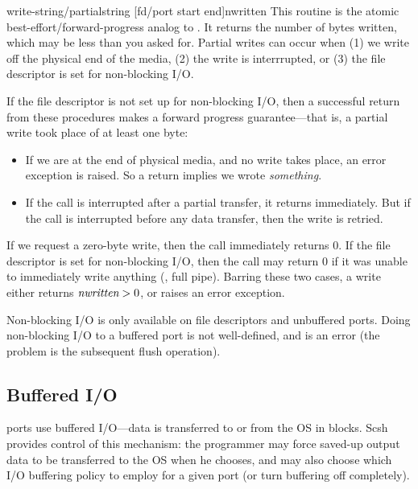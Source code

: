 \begin{defundescx}{write-string/partial}{string [fd/port start end]}{nwritten}
    This routine is the atomic best-effort/forward-progress analog
    to .
    It returns the number of bytes written, which may be less than you
    asked for.
    Partial writes can occur when (1) we write off the physical end of
    the media, (2) the write is interrrupted, or (3) the file descriptor
    is set for non-blocking I/O.

    If the file descriptor is not set up for non-blocking I/O, then
    a successful return from these procedures makes a forward progress
    guarantee---that is, a partial write took place of at least one byte:
    \begin{itemize}
    \item If we are at the end of physical media, and no write takes place,
      an error exception is raised.
      So a return implies we wrote \emph{something}.
    \item If the call is interrupted after a partial transfer, it returns
      immediately. But if the call is interrupted before any data transfer,
      then the write is retried.
    \end{itemize}

    If we request a zero-byte write, then the call immediately returns 0.
    If the file descriptor is set for non-blocking I/O, then the call
    may return 0 if it was unable to immediately write anything
    (\eg, full pipe).
    Barring these two cases, a write either returns $\var{nwritten} > 0$, 
    or raises an error exception.

    Non-blocking I/O is only available on file descriptors and unbuffered
    ports. Doing non-blocking I/O to a buffered port is not well-defined,
    and is an error (the problem is the subsequent flush operation).
    
\end{defundescx}

\subsection{Buffered I/O}

{\scm} ports use buffered I/O---data is transferred to or from the
OS in blocks. Scsh provides control of this mechanism: the programmer
may force saved-up output data to be transferred to the OS when
he chooses, 
and may also choose which I/O buffering policy to employ for a given
port (or turn buffering off completely). 

